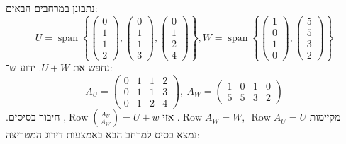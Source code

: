 \documentclass[]{article}
\DeclareMathOperator{\Sp}     {span}
\DeclareMathOperator{\row}    {Row}
\newcommand\pms[1]    {\begin{pmatrix}
        #1
\end{pmatrix}}
\newcommand\ccb[1]    {\left \{ #1 \right \}}
\theoremstyle{definition}
\begin{document}
    \section{}
    נתבונן במרחבים הבאים: 
    \[ U = \Sp\ccb{\pms{0 \\1  \\ 1 \\ 2} , \pms{0 \\1 \\ 1 \\ 3} ,\pms{0 \\1 \\2 \\4}}, W = \Sp\ccb{\pms{1 \\ 0 \\ 1 \\ 0}, \pms{5 \\ 5 \\3 \\2}} \]
    נחפש את $U + W$. ידוע ש־: 
    \[ A_U = \pms{0 & 1 & 1 & 2 \\ 0 & 1 & 1 & 3 \\ 0 & 1 &2 &4}, \ A_W = \pms{1 & 0 & 1 & 0 \\ 5 & 5 & 3 & 2} \]
    מקיימות $\row A_W = W, \ \row A_U = U$. אזי $\row\binom{A_U}{A_W} = U + w$, חיבור בסיסים. נמצא בסיס למרחב הבא באמצעות דירוג המטריצה: 
\end{document}
